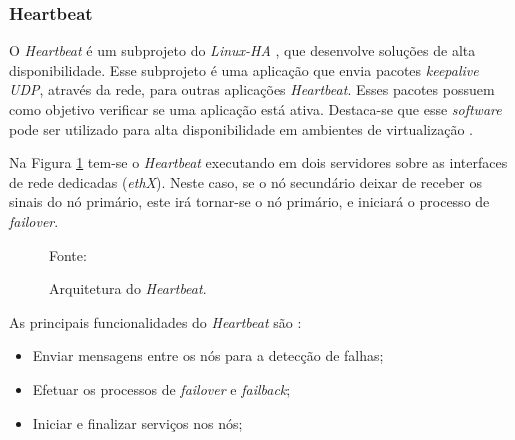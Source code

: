 \subsubsection{Heartbeat}
\label{section:heartbeat}
O \textit{Heartbeat} é um subprojeto do \textit{Linux-HA} \cite{linuxha}, que desenvolve soluções de alta disponibilidade.
Esse subprojeto é uma aplicação que envia pacotes \textit{keepalive \ac{UDP}}, através da rede, para outras aplicações \textit{Heartbeat}. 
Esses pacotes possuem como objetivo verificar se uma aplicação está ativa.
Destaca-se que esse \textit{software} pode ser utilizado para alta disponibilidade em ambientes de virtualização \cite{reis2009}.

Na Figura \ref{fig:heartbeat} tem-se o \textit{Heartbeat} executando em dois servidores sobre as interfaces de rede dedicadas (\textit{ethX}).
Neste caso, se o nó secundário deixar de receber os sinais do nó primário, este irá tornar-se o nó primário, e iniciará o processo de 
\textit{failover}. 
\begin{figure}[h!]
 \centering
 \caption{Arquitetura do \textit{Heartbeat}.}
 Fonte: \citet{zaminhani2008}
 \label{fig:heartbeat}
\end{figure}

As principais funcionalidades do \textit{Heartbeat} são \cite{clusterlabs}:
\begin{itemize}
 \item Enviar mensagens entre os nós para a detecção de falhas;
 \item Efetuar os processos de \textit{failover} e \textit{failback};
 \item Iniciar e finalizar serviços nos nós;
\end{itemize}


